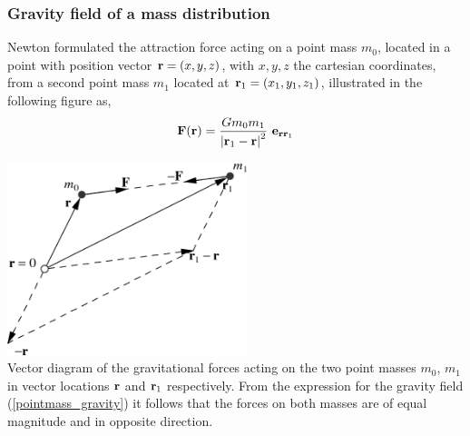 \vspace{0.5cm}

\vspace{0.5cm}

\subsubsection{Gravity field of a mass distribution}
Newton formulated the attraction force acting on a point 
mass $m_0$, 
located in a point with position vector ${\bf r}=(x,y,z)$,
with $x,y,z$ the cartesian coordinates,
from a second point mass $m_1$ located at
${\bf r}_1=(x_1,y_1,z_1)$, illustrated in the following figure as,
\begin{equation}
{\bf F} ({\bf r}) 
        =\frac{G m_0 m_1}{\left | {\bf r}_1 - {\bf r} \right | ^2} ~ 
          {\bf e}_{{\bf r r}_1}
\label{pointmass_gravity}
\end{equation}

\begin{center}
\includegraphics[width=7cm]{images/gravity/gravity_diagram.png}\\
{\captionfont Vector diagram of the gravitational forces acting on the two 
point masses $m_0$, $m_1$ in vector locations ${\bf r}$ and
${\bf r}_1$ respectively.
From the expression for the gravity field (\ref{pointmass_gravity}) 
it follows that the forces on both masses
are of equal magnitude and in opposite direction. }
\end{center}

